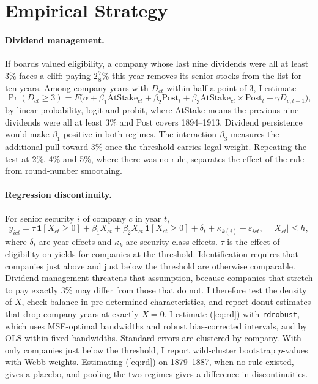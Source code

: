 \documentclass[11pt]{article}
\begin{document}
\section{Empirical Strategy}\label{sec:strategy}

\paragraph{Dividend management.} If boards valued eligibility, a company whose last nine dividends were all at least 3\% faces a cliff: paying $2\tfrac{7}{8}$\% this year removes its senior stocks from the list for ten years. Among company-years with $D_{ct}$ within half a point of 3, I estimate
\begin{equation}\label{eq:bunch}
\Pr(D_{ct} \ge 3) = F\big(\alpha + \beta_1 \text{AtStake}_{ct} + \beta_2 \text{Post}_t + \beta_3 \text{AtStake}_{ct}\times\text{Post}_t + \gamma D_{c,t-1}\big),
\end{equation}
by linear probability, logit and probit, where AtStake means the previous nine dividends were all at least 3\% and Post covers 1894--1913. Dividend persistence \citep{Lintner1956} would make $\beta_1$ positive in both regimes. The interaction $\beta_3$ measures the additional pull toward 3\% once the threshold carries legal weight. Repeating the test at 2\%, 4\% and 5\%, where there was no rule, separates the effect of the rule from round-number smoothing.

\paragraph{Regression discontinuity.} For senior security $i$ of company $c$ in year $t$,
\begin{equation}\label{eq:rd}
y_{ict} = \tau\,\mathbf{1}[X_{ct} \ge 0] + \beta_1 X_{ct} + \beta_2 X_{ct}\,\mathbf{1}[X_{ct} \ge 0] + \delta_t + \kappa_{k(i)} + \varepsilon_{ict}, \quad |X_{ct}| \le h,
\end{equation}
where $\delta_t$ are year effects and $\kappa_k$ are security-class effects. $\tau$ is the effect of eligibility on yields for companies at the threshold. Identification requires that companies just above and just below the threshold are otherwise comparable. Dividend management threatens that assumption, because companies that stretch to pay exactly 3\% may differ from those that do not. I therefore test the density of $X$, check balance in pre-determined characteristics, and report donut estimates that drop company-years at exactly $X=0$. I estimate (\ref{eq:rd}) with \texttt{rdrobust}, which uses MSE-optimal bandwidths and robust bias-corrected intervals, and by OLS within fixed bandwidths. Standard errors are clustered by company. With only \rdGlHone{} companies just below the threshold, I report wild-cluster bootstrap $p$-values with Webb weights. Estimating (\ref{eq:rd}) on 1879--1887, when no rule existed, gives a placebo, and pooling the two regimes gives a difference-in-discontinuities.
\end{document}
